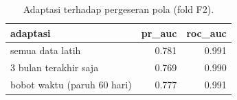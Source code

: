 \begin{table}[ht]
\centering\small
\begin{tabular}{lrr}
\toprule
adaptasi & pr\_auc & roc\_auc \\
\midrule
semua data latih & 0.781 & 0.991 \\
3 bulan terakhir saja & 0.769 & 0.990 \\
bobot waktu (paruh 60 hari) & 0.777 & 0.991 \\
\bottomrule
\end{tabular}
\caption{Adaptasi terhadap pergeseran pola (fold F2).}
\label{tab:t2_adaptasi}
\end{table}
